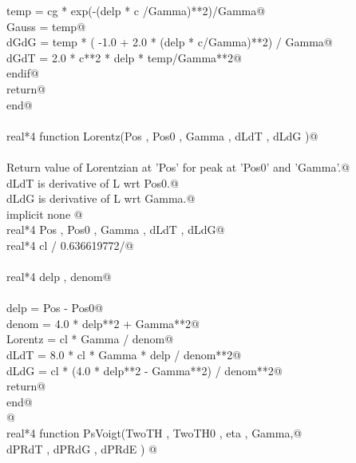\documentclass[10pt,a4paper,notitlepage]{article}
\begin{document}
\begin{flushleft}
\begin{list}{}{}
\mbox{}\verb@        temp = cg * exp(-(delp * c /Gamma)**2)/Gamma@\\
\mbox{}\verb@        Gauss = temp@\\
\mbox{}\verb@        dGdG = temp * ( -1.0 + 2.0 * (delp * c/Gamma)**2) / Gamma@\\
\mbox{}\verb@        dGdT = 2.0 * c**2 * delp * temp/Gamma**2@\\
\mbox{}\verb@      endif@\\
\mbox{}\verb@      return@\\
\mbox{}\verb@      end@\\
\mbox{}\verb@@\\
\mbox{}\verb@      real*4 function Lorentz(Pos , Pos0 , Gamma , dLdT , dLdG )@\\
\mbox{}\verb@@\\
\mbox{}\verb@c  Return value of Lorentzian at 'Pos' for peak at 'Pos0' and 'Gamma'.@\\
\mbox{}\verb@c  dLdT is derivative of L wrt Pos0.@\\
\mbox{}\verb@c  dLdG is derivative of L wrt Gamma.@\\
\mbox{}\verb@      implicit none      @\\
\mbox{}\verb@      real*4 Pos , Pos0 , Gamma , dLdT , dLdG@\\
\mbox{}\verb@      real*4 cl / 0.636619772/@\\
\mbox{}\verb@@\\
\mbox{}\verb@      real*4  delp , denom@\\
\mbox{}\verb@@\\
\mbox{}\verb@      delp = Pos - Pos0@\\
\mbox{}\verb@      denom = 4.0 * delp**2 + Gamma**2@\\
\mbox{}\verb@      Lorentz = cl * Gamma / denom@\\
\mbox{}\verb@      dLdT = 8.0 * cl * Gamma * delp / denom**2@\\
\mbox{}\verb@      dLdG = cl * (4.0 * delp**2 - Gamma**2) / denom**2@\\
\mbox{}\verb@      return@\\
\mbox{}\verb@      end@\\
\mbox{}\verb@C                         @\\
\mbox{}\verb@      real*4 function PsVoigt(TwoTH , TwoTH0 , eta , Gamma,@\\
\mbox{}         dPRdT , dPRdG , dPRdE ) @\\
\mbox{}\verb@c@\\

\end{list}
\end{flushleft}
\end{document}
